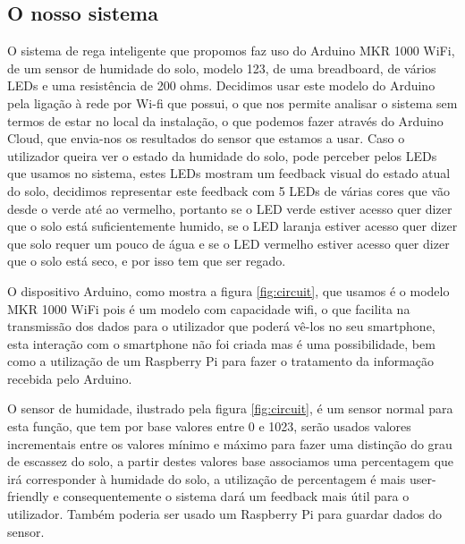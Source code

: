 \documentclass[conference]{IEEEtran}
\begin{document}
\subsection{O nosso sistema}

O sistema de rega inteligente que propomos faz uso do Arduino MKR 1000 WiFi, 
de um sensor de humidade do solo, modelo 123, de uma breadboard, de vários LEDs 
e uma resistência de 200 ohms. Decidimos usar este modelo do Arduino pela ligação 
à rede por Wi-fi que possui, o que nos permite analisar o sistema sem termos de 
estar no local da instalação, o que podemos fazer através do Arduino Cloud, 
que envia-nos os resultados do sensor que estamos a usar. Caso o utilizador 
queira ver o estado da humidade do solo, pode perceber pelos LEDs que usamos no sistema, 
estes LEDs mostram um feedback visual do estado atual do solo, decidimos representar este 
feedback com 5 LEDs de várias cores que vão desde o verde até ao vermelho, portanto 
se o LED verde estiver acesso quer dizer que o solo está suficientemente humido, se 
o LED laranja estiver acesso quer dizer que solo requer um pouco de água e se o LED
vermelho estiver acesso quer dizer que o solo está seco, e por isso tem que ser regado.

O dispositivo Arduino, como mostra a figura \ref{fig:circuit}, que usamos é o 
modelo MKR 1000 WiFi pois é um modelo com capacidade wifi, o que facilita na 
transmissão dos dados para o utilizador que poderá vê-los no seu smartphone, 
esta interação com o smartphone não foi criada mas é uma possibilidade, bem 
como a utilização de um Raspberry Pi para fazer o tratamento da informação 
recebida pelo Arduino.

O sensor de humidade, ilustrado pela figura \ref{fig:circuit}, é um 
sensor normal para esta função, que tem por base valores entre 0 e 1023, serão usados valores 
incrementais entre os valores mínimo e máximo para fazer uma distinção do grau 
de escassez do solo, a partir destes valores base associamos uma percentagem 
que irá corresponder à humidade do solo, a utilização de percentagem é 
mais user-friendly e consequentemente o sistema dará um feedback mais útil
para o utilizador. Também poderia ser usado um Raspberry Pi para guardar dados do sensor.
\end{document}
